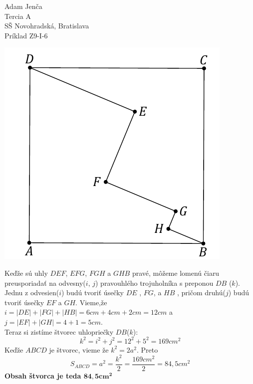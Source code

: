 \documentclass{article}
\begin{document}
\noindent
\large
Adam Jenča\\
Tercia A\\
SŠ Novohradská, Bratislava\\
Príklad Z9-I-6\\
\vskip 5mm \noindent
\begin{center}
	\includegraphics[scale=0.3]{xetex/imagery/squeer}
\end{center}
\vskip 5mm
Keďže sú uhly $DEF$, $EFG$, $FGH$ a $GHB$ pravé, môžeme lomenú čiaru preusporiadať na odvesny($i$, $j$) pravouhlého trojuholníka s preponou $DB$ ($k$). Jednu z odvesien($i$) budú tvoriť úsečky $DE$ , $FG$, a $HB$ , pričom druhú($j$) budú tvoriť úsečky $EF$ a $GH$. Vieme,že $i = |DE| + |FG| + |HB| = 6cm + 4cm + 2cm = 12cm$ a $j = |EF| + |GH| = 4+1=5cm$.\\
Teraz si zistíme štvorec uhlopriečky $DB$($k$):
$$
	k^2 = i^2 + j^2 = 12^2 + 5^2 = 169cm^2
$$
Keďže $ABCD$ je štvorec, vieme že $k^2 = 2a^2$. Preto
$$
	S_{ABCD} = a^2 = \frac{k^2}{2} = \frac{169cm^2}{2} = 84,5cm^2
$$
\textbf{Obsah štvorca je teda $\mathbf{84,5cm^2}$}
\end{document}

